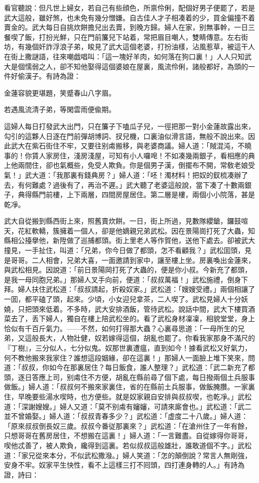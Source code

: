 看官聽說：但凡世上婦女，若自己有些顔色，所禀伶俐，配個好男子便罷了，若是武大這般，雖好煞，也未免有幾分憎嫌。自古佳人才子相凑着的少，買金偏撞不着賣金的。武大每日自挑炊餅擔兒出去賣，到晚方歸。婦人在家，别無事幹，一日三餐喫了飯，打扮光鮮，只在門前簾兒下站着，常把眉目嘲人，雙睛傳意。左右街坊，有幾個奸詐浮浪子弟，睃見了武大這個老婆，打扮油樣，沾風惹草，被這干人在街上撒謎語，往來嘲戯唱叫：「這一塊好羊肉，如何落在狗口裏！」人人只知武大是個懦弱之人，卻不知他娶得這個婆娘在屋裏，風流伶俐，諸般都好，為頭的一件好偷漢子。有詩為證：

\begin{myquote}
金蓮容貌更堪題，笑蹙春山八字眉。

若遇風流清子弟，等閑雲雨便偸期。
\end{myquote}

這婦人每日打發武大出門，只在簾子下嗑瓜子兒，一徑把那一對小金蓮故露出來，勾引的這夥人日逐在門前彈胡博詞、扠兒機，口裏油似滑言語，無般不說出來。因此武大在紫石街住不牢，又要往别䖏搬移，與老婆商議。婦人道：「賊混沌，不曉事的！你賃人家房住，淺房淺屋，可知有小人囉唣！不如凑幾兩銀子，看相應的典上他兩間住，卻也氣概些，免受人欺負。你是個男子漢，倒擺布不開，常敎老娘受氣！」武大道：「我那裏有錢典房？」婦人道：「呸！濁材料！把奴的釵梳凑辦了去，有何難處？過後有了，再治不遲。」武大聽了老婆這般說，當下凑了十數兩銀子，典得縣門前樓，上下兩層，四間房屋居住。第二層是樓，兩個小小院落，甚是乾凈。

武大自從搬到縣西街上來，照舊賣炊餅。一日，街上所過，見數隊纓鎗，鑼鼓喧天，花紅軟轎，簇擁着一個人，卻是他嫡親兄弟武松。因在景陽崗打死了大蟲，知縣相公擡擧他，新陞做了巡捕都頭。街上里老人等作賀他，送他下處去。卻被武大撞見，一手扯住，叫道：「兄弟，你今日做了都頭，怎不看顧我？」武松囬頭，見是哥哥。二人相會，兄弟大喜，一面邀請到家中，讓至樓上坐。房裏喚出金蓮來，與武松相見。因說道：「前日景陽岡打死了大蟲的，便是你小叔。今新充了都頭，是我一母同胞兄弟。」那婦人叉手向前，便道：「叔叔萬福！」武松施禮，倒身下拜。婦人扶住武松道：「叔叔請起，折殺奴家。」武松道：「嫂嫂受禮。」兩個相讓了一囬，都平磕了頭，起來。少頃，小女迎兒拿茶，二人喫了。武松見婦人十分妖嬈，只把頭來低着。不多時，武大安排酒飯，管待武松。說話中間，武大下樓買酒菜去了，丢下婦人，獨自在樓上陪武松坐的。看了武松身材凜凜，相貌堂堂，身上恰似有千百斤氣力。——不然，如何打得那大蟲？心裏尋思道：「一母所生的兄弟，又這般長大，人物壯健，奴若嫁得這個，胡亂也罷了。你看我家那身不滿尺的『丁樹』，三分似人，七分似鬼。奴那世裏遭瘟，直到如今！據看武松又好氣力，何不教他搬來我家住？誰想這段姻緣，卻在這裏！」那婦人一面臉上堆下笑來，問道：「叔叔，你如今在那裏居住？每日飯食，誰人整理？」武松道：「武二新充了都頭，逐日答應上司，别䖏住不方便，胡亂在縣前尋了個下處，每日撥兩個土兵服事做飯。」婦人道：「叔叔何不搬來家裏住，省的在縣前土兵服事，做飯腌臢。一家裏住，早晚要些湯水喫時，也方便些。就是奴家親自安排與叔叔喫，也乾凈。」武松道：「深謝嫂嫂。」婦人又道：「莫不别䖏有嬸嬸，可請來廝會也。」武松道：「武二並不曾婚娶。」婦人道：「叔叔青春多少？」武松道：「虚度二十八歲。」婦人道：「原來叔叔倒長奴三歲。叔叔今番従那裏來？」武松道：「在滄州住了一年有餘，只想哥哥在舊房居住，不想搬在這裏！」婦人道：「一言難盡。自從嫁得你哥哥，喫他忒善了，被人欺負，纔得到這裏。若似叔叔這般雄壯，誰敢道個不字。」武松道：「家兄從來本分，不似武松撒潑。」婦人笑道：「怎的顛倒說？常言人無剛強，安身不牢。奴家平生快性，看不上這樣三打不囘頭，四打連身轉的人。」有詩為證，詩曰：

